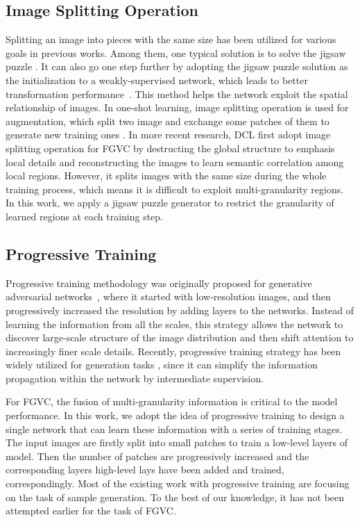\documentclass{llncs}
\begin{document}
\subsection{Image Splitting Operation}
Splitting an image into pieces with the same size has been utilized for various goals in previous works. Among them, one typical solution is to solve the jigsaw puzzle \cite{cho2010probabilistic,son2014solving}. It can also go one step further by adopting the jigsaw puzzle solution as the initialization to a weakly-supervised network, which leads to better transformation performance~\cite{wei2019iterative}. This method helps the network exploit the spatial relationship of images. In one-shot learning, image splitting operation is used for augmentation, which split two image and exchange some patches of them to generate new training ones \cite{chen2019image}. In more recent research, DCL \cite{chen2019destruction} first adopt image splitting operation for FGVC by destructing the global structure to emphasis local details and reconstructing the images to learn semantic correlation among local regions. However, it splits images with the same size during the whole training process, which means it is difficult to exploit multi-granularity regions. In this work, we apply a jigsaw puzzle generator to restrict the granularity of learned regions at each training step.

\subsection{Progressive Training}
Progressive training methodology was originally proposed for generative adversarial networks~\cite{karras2017progressive}, where it started with low-resolution images, and then progressively increased the resolution by adding layers to the networks. Instead of learning the information from all the scales, this strategy allows the network to discover large-scale structure of the image distribution and then shift attention to increasingly ﬁner scale details.  Recently, progressive training strategy has been widely utilized for generation tasks \cite{karras2019style,shaham2019singan,wang2018fully,ahn2018image}, since it can simplify the information propagation within the network by intermediate supervision. 

For FGVC, the fusion of multi-granularity information is critical to the model performance. In this work, we adopt the idea of progressive training to design a single network that can learn these information with a series of training stages. The input images are firstly split into small patches to train a low-level layers of model. Then the number of patches are progressively increased and the corresponding layers high-level lays have been added and trained, correspondingly. Most of the existing work with progressive training are focusing on the task of sample generation. To the best of our knowledge, it has not been attempted earlier for the task of FGVC.
\end{document}
